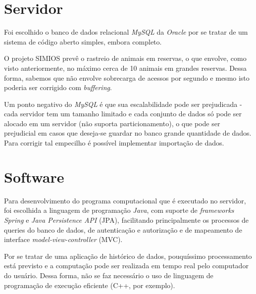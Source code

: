 \section{Servidor}
Foi escolhido o banco de dados relacional \emph{MySQL} da \emph{Oracle} por se tratar de um sistema de código aberto simples, embora completo.

O projeto SIMIOS prevê o rastreio de animais em reservas, o que envolve, como visto anteriormente, no máximo cerca de 10 animais em grandes reservas. Dessa forma, sabemos que não envolve sobrecarga de acessos por segundo e mesmo isto poderia ser corrigido com \emph{buffering}.

Um ponto negativo do \emph{MySQL} é que sua escalabilidade pode ser prejudicada - cada servidor tem um tamanho limitado e cada conjunto de dados só pode ser alocado em um servidor (não suporta particionamento), o que pode ser prejudicial em casos que deseja-se guardar no banco grande quantidade de dados. Para corrigir tal empecilho é possível implementar importação de dados.

\section{Software}
Para desenvolvimento do programa computacional que é executado no servidor, foi escolhida a linguagem de programação \emph{Java}, com suporte de \emph{frameworks} \emph{Spring} e \emph{Java Persistence API} (JPA), facilitando principalmente os processos de queries do banco de dados, de autenticação e autorização e de mapeamento de interface \emph{model-view-controller} (MVC).

Por se tratar de uma aplicação de histórico de dados, pouquíssimo processamento está previsto e a computação pode ser realizada em tempo real pelo computador do usuário. Dessa forma, não se faz necessário o uso de linguagem de programação de execução eficiente (C++, por exemplo).

